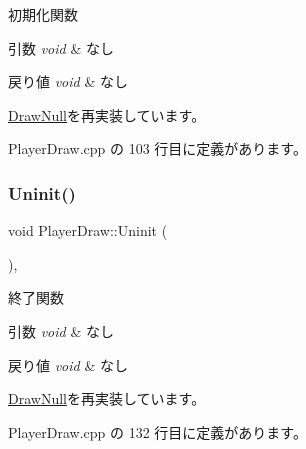 初期化関数 


\begin{DoxyParams}{引数}
{\em void} & なし \\
\hline
\end{DoxyParams}

\begin{DoxyRetVals}{戻り値}
{\em void} & なし \\
\hline
\end{DoxyRetVals}


\mbox{\hyperlink{class_draw_null_a20aef1e54c1a158b741bfd731e18efdf}{Draw\+Null}}を再実装しています。



 Player\+Draw.\+cpp の 103 行目に定義があります。

\mbox{\label{class_player_draw_a917b2947914287f23d87ca75cd68f553}} 
\subsubsection{\texorpdfstring{Uninit()}{Uninit()}}
{\footnotesize\ttfamily void Player\+Draw\+::\+Uninit (\begin{DoxyParamCaption}{ }\end{DoxyParamCaption})\hspace{0.3cm}{\ttfamily [override]}, {\ttfamily [virtual]}}



終了関数 


\begin{DoxyParams}{引数}
{\em void} & なし \\
\hline
\end{DoxyParams}

\begin{DoxyRetVals}{戻り値}
{\em void} & なし \\
\hline
\end{DoxyRetVals}


\mbox{\hyperlink{class_draw_null_a6e81d63efab7333e8d0e8af99362a4d9}{Draw\+Null}}を再実装しています。



 Player\+Draw.\+cpp の 132 行目に定義があります。

\mbox{\label{class_player_draw_aa16d0fb9345c08df3b3a626128707cf7}} 
